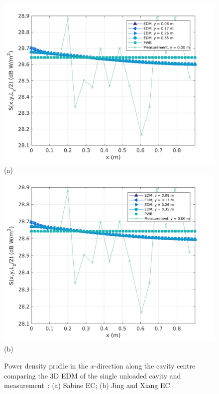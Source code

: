 \documentclass[a4paper]{article}
\numberwithin{equation}{section}
\begin{document}
\begin{figure}[hp]
\begin{center}
\includegraphics[width=0.6\linewidth]{figures/SDM_3D_SU_PowerDensityProfileXMeas}\\
{\footnotesize (a)}\\
\vspace{2mm}
\includegraphics[width=0.6\linewidth]{figures/SDM_3D_SU_PowerDensityProfileXMeas_JX}\\
{\footnotesize (b)}\\
\vspace{-2mm}
\caption{\label{fg:measprofssu} Power density profile in the $x$-direction along the cavity centre comparing
the 3D EDM of the single unloaded cavity and measurement~\citep{Flintoft2017b}: (a) Sabine EC; (b) Jing and Xiang EC.}
\end{center}
\end{figure}
\end{document}
